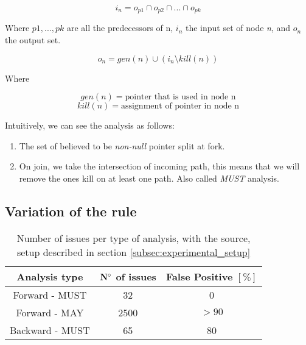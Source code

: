 \begin{equation}\label{eqn:dataflow1}
i_{n} = o_{p1}  \cap   o_{p2}  \cap  ... \cap   o_{pk}
\end{equation}

Where $p1, ..., pk$ are all the predecessors of n, $i_{n}$ the input set of node \emph{n}, and  $o_{n}$ the output set.

\begin{equation}\label{eqn:dataflow2}
o_{n} = gen(n)  \cup   (i_{n} \setminus kill(n))
\end{equation}

Where

\begin{equation}\label{eqn:dataflow3}
gen(n) =\text{pointer that is used in node n}
\end{equation}
\begin{equation}\label{eqn:dataflow4}
kill(n) = \text{assignment of pointer in node n}
\end{equation}

Intuitively, we can see the analysis as follows:
\begin{enumerate}
	\item The set of believed to be \emph{non-null} pointer split at fork. \newline 
	\item On join, we take the intersection of incoming path, this means that we will remove the ones kill on at least one path. Also called \emph{MUST} analysis. \newline 
\end{enumerate}

\subsection{Variation of the rule}
\label{subsec:rule_variation}

\begin{table}[h]
	\centering
	\caption{Number of issues per type of analysis, with the source, setup described in section \ref{subsec:experimental_setup}}
	\label{table:issue_per_analysis_type}
	\begin{tabular}{|c|c|c|}
		\hline
		\bf Analysis type &  \bf $\bf N^{\circ}$  of issues &  \bf False Positive $[\%]$ \\ \hline
		Forward - MUST &  32 &  0 \\ 
		Forward - MAY &  2500 & $> 90$  \\ 
		Backward - MUST &  65 & 80 \\ \hline
	\end{tabular}
\end{table}

